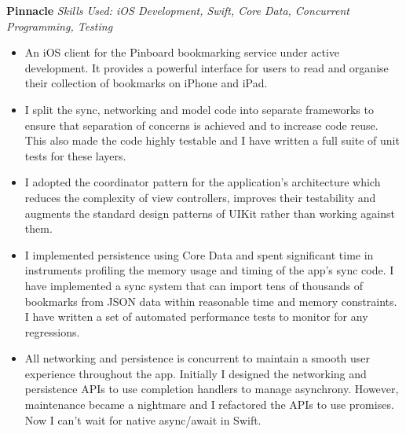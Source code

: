 \textbf{Pinnacle}  \newline
\textit{Skills Used: iOS Development, Swift, Core Data, Concurrent Programming, Testing}
%
\begin{itemize}[leftmargin=0mm]
\item An iOS client for the Pinboard bookmarking service under active
  development. It provides a powerful interface for users to read and organise
  their collection of bookmarks on iPhone and iPad.
\item I split the sync, networking and model code into separate frameworks to
  ensure that separation of concerns is achieved and to increase code
  reuse. This also made the code highly testable and I have written a full suite
  of unit tests for these layers.
\item I adopted the coordinator pattern for the application's architecture which
  reduces the complexity of view controllers, improves their testability and
  augments the standard design patterns of UIKit rather than working against
  them.
\item I implemented persistence using Core Data and spent significant time in
  instruments profiling the memory usage and timing of the app's sync code. I
  have implemented a sync system that can import tens of thousands of bookmarks
  from JSON data within reasonable time and memory constraints. I have written a
  set of automated performance tests to monitor for any regressions.
\item All networking and persistence is concurrent to maintain a smooth user
  experience throughout the app. Initially I designed the networking and
  persistence APIs to use completion handlers to manage asynchrony. However,
  maintenance became a nightmare and I refactored the APIs to use promises. Now
  I can't wait for native async/await in Swift.
\end{itemize}

